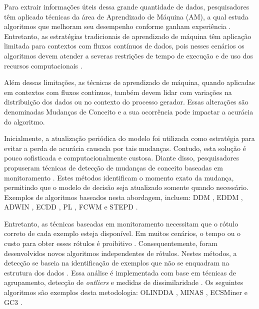 \documentclass[qual, classic, a4paper]{ufbathesis}
\begin{document}
Para extrair informações úteis dessa grande quantidade de dados, 
pesquisadores têm aplicado técnicas da área de Aprendizado de Máquina (AM), 
a qual estuda algoritmos que melhoram seu desempenho conforme ganham experiência \cite{Mitchell:1997:ML:541177}.
%
Entretanto, as estratégias tradicionais de aprendizado de máquina têm aplicação limitada para contextos com fluxos contínuos de dados, 
pois nesses cenários os algoritmos devem atender a severas restrições de tempo de execução e de uso dos recursos computacionais \cite{bifet2009data}.

Além dessas limitações, 
as técnicas de aprendizado de máquina, 
quando aplicadas em contextos com fluxos contínuos, 
também devem lidar com variações na distribuição dos dados ou no contexto do processo gerador.
%
Essas alterações são denominadas Mudanças de Conceito \cite{Gama:2010:KDD:1855075} e 
a sua ocorrência pode impactar a acurácia do algoritmo.

Inicialmente, a atualização periódica do modelo foi utilizada como estratégia para evitar a perda de acurácia causada por tais mudanças.
%
Contudo, esta solução é pouco sofisticada e computacionalmente custosa.
% 
Diante disso, pesquisadores propuseram técnicas de detecção de mudanças de conceito baseadas em monitoramento \cite{Gama:2014:SCD:2597757.2523813}.
% 
Estes métodos identificam o momento exato da mudança, permitindo que o modelo de decisão seja atualizado somente quando necessário.
%
Exemplos de algoritmos baseados nesta abordagem, incluem: 
DDM \cite{GamaMCR04}, EDDM \cite{EDDM},  
ADWIN \cite{BifetG07}, ECDD \cite{Ross:2012:EWM:2076039.2076307}, 
PL \cite{Bach:PL:2008}, FCWM \cite{FCWM} e STEPD \cite{STEPD}.

Entretanto, as técnicas baseadas em monitoramento necessitam que o rótulo correto de cada exemplo esteja disponível.
%
Em muitos cenários, o tempo ou o custo para obter esses rótulos é proibitivo \cite{Aggarwal:2006:DSM:1196418}.
%
Consequentemente, foram desenvolvidos novos algoritmos independentes de rótulos.
Nestes métodos, a detecção se baseia na identificação de exemplos que não se enquadram na estrutura dos dados \cite{Spinosa:2007:OCA:1244002.1244107}.
% 
Essa análise é implementada com base em técnicas de agrupamento, detecção de \textit{outliers} e medidas de dissimilaridade \cite{Ryu:Kantardzic:2012}.
%
Os seguintes algoritmos são exemplos desta metodologia:
OLINDDA \cite{Spinosa:2007:OCA:1244002.1244107},
MINAS \cite{Faria:2013:NDA:2480362.2480515},
ECSMiner \cite{Masud:2011:CNC:1978259.1978529} e 
GC3 \cite{Sethi2016b:GC3}.
\end{document}
